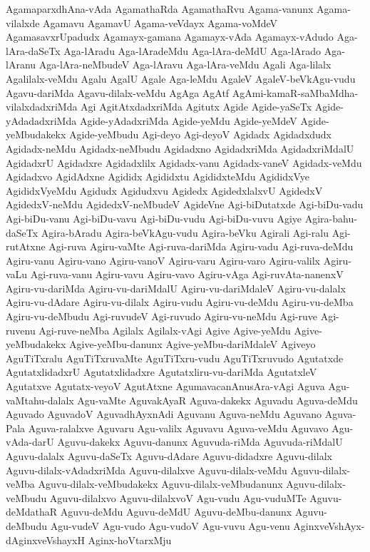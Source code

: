 {AgamaparxdhAna-vAda
AgamathaRda
AgamathaRvu
Agama-vanunx
Agama-vilalxde
Agamavu
AgamavU
Agama-veVdayx
Agama-voMdeV
AgamasavxrUpadudx
Agamayx-gamana
Agamayx-vAda
Agamayx-vAdudo
Aga-lAra-daSeTx
Aga-lAradu
Aga-lAradeMdu
Aga-lAra-deMdU
Aga-lArado
Aga-lAranu
Aga-lAra-neMbudeV
Aga-lAravu
Aga-lAra-veMdu
Agali
Aga-lilalx
Agalilalx-veMdu
Agalu
AgalU
Agale
Aga-leMdu
AgaleV
AgaleV-beVkAgu-vudu
Agavu-dariMda
Agavu-dilalx-veMdu
AgAga
AgAtf
AgAmi-kamaR-saMbaMdha-vilalxdadxriMda
Agi
AgitAtxdadxriMda
Agitutx
Agide
Agide-yaSeTx
Agide-yAdadadxriMda
Agide-yAdadxriMda
Agide-yeMdu
Agide-yeMdeV
Agide-yeMbudakekx
Agide-yeMbudu
Agi-deyo
Agi-deyoV
Agidadx
Agidadxdudx
Agidadx-neMdu
Agidadx-neMbudu
Agidadxno
AgidadxriMda
AgidadxriMdalU
AgidadxrU
Agidadxre
Agidadxlilx
Agidadx-vanu
Agidadx-vaneV
Agidadx-veMdu
Agidadxvo
AgidAdxne
Agididx
Agididxtu
AgididxteMdu
AgididxVye
AgididxVyeMdu
Agidudx
Agidudxvu
Agidedx
AgidedxlalxvU
AgidedxV
AgidedxV-neMdu
AgidedxV-neMbudeV
AgideVne
Agi-biDutatxde
Agi-biDu-vadu
Agi-biDu-vanu
Agi-biDu-vavu
Agi-biDu-vudu
Agi-biDu-vuvu
Agiye
Agira-bahu-daSeTx
Agira-bAradu
Agira-beVkAgu-vudu
Agira-beVku
Agirali
Agi-ralu
Agi-rutAtxne
Agi-ruva
Agiru-vaMte
Agi-ruva-dariMda
Agiru-vadu
Agi-ruva-deMdu
Agiru-vanu
Agiru-vano
Agiru-vanoV
Agiru-varu
Agiru-varo
Agiru-valilx
Agiru-vaLu
Agi-ruva-vanu
Agiru-vavu
Agiru-vavo
Agiru-vAga
Agi-ruvAta-nanenxV
Agiru-vu-dariMda
Agiru-vu-dariMdalU
Agiru-vu-dariMdaleV
Agiru-vu-dalalx
Agiru-vu-dAdare
Agiru-vu-dilalx
Agiru-vudu
Agiru-vu-deMdu
Agiru-vu-deMba
Agiru-vu-deMbudu
Agi-ruvudeV
Agi-ruvudo
Agiru-vu-neMdu
Agi-ruve
Agi-ruvenu
Agi-ruve-neMba
Agilalx
Agilalx-vAgi
Agive
Agive-yeMdu
Agive-yeMbudakekx
Agive-yeMbu-danunx
Agive-yeMbu-dariMdaleV
Agiveyo
AguTiTxralu
AguTiTxruvaMte
AguTiTxru-vudu
AguTiTxruvudo
Agutatxde
AgutatxlidadxrU
Agutatxlidadxre
Agutatxliru-vu-dariMda
AgutatxleV
Agutatxve
Agutatx-veyoV
AgutAtxne
AgumavacanAnusAra-vAgi
Aguva
Agu-vaMtahu-dalalx
Agu-vaMte
AguvakAyaR
Aguva-dakekx
Aguvadu
Aguva-deMdu
Aguvado
AguvadoV
AguvadhAyxnAdi
Aguvanu
Aguva-neMdu
Aguvano
Aguva-Pala
Aguva-ralalxve
Aguvaru
Agu-valilx
Aguvavu
Aguva-veMdu
Aguvavo
Agu-vAda-darU
Aguvu-dakekx
Aguvu-danunx
Aguvuda-riMda
Aguvuda-riMdalU
Aguvu-dalalx
Aguvu-daSeTx
Aguvu-dAdare
Aguvu-didadxre
Aguvu-dilalx
Aguvu-dilalx-vAdadxriMda
Aguvu-dilalxve
Aguvu-dilalx-veMdu
Aguvu-dilalx-veMba
Aguvu-dilalx-veMbudakekx
Aguvu-dilalx-veMbudanunx
Aguvu-dilalx-veMbudu
Aguvu-dilalxvo
Aguvu-dilalxvoV
Agu-vudu
Agu-vuduMTe
Aguvu-deMdathaR
Aguvu-deMdu
Aguvu-deMdU
Aguvu-deMbu-danunx
Aguvu-deMbudu
Agu-vudeV
Agu-vudo
Agu-vudoV
Agu-vuvu
Agu-venu
AginxveVshAyx-dAginxveVshayxH
Aginx-hoVtarxMju
}
